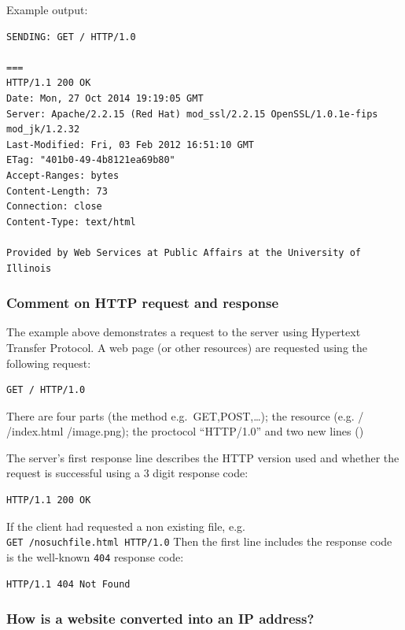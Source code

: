 \documentclass[]{article}
\begin{document}
Example output:

\begin{verbatim}
SENDING: GET / HTTP/1.0

===
HTTP/1.1 200 OK
Date: Mon, 27 Oct 2014 19:19:05 GMT
Server: Apache/2.2.15 (Red Hat) mod_ssl/2.2.15 OpenSSL/1.0.1e-fips mod_jk/1.2.32
Last-Modified: Fri, 03 Feb 2012 16:51:10 GMT
ETag: "401b0-49-4b8121ea69b80"
Accept-Ranges: bytes
Content-Length: 73
Connection: close
Content-Type: text/html

Provided by Web Services at Public Affairs at the University of Illinois
\end{verbatim}

\subsubsection{Comment on HTTP request and
response}\label{comment-on-http-request-and-response}

The example above demonstrates a request to the server using Hypertext
Transfer Protocol. A web page (or other resources) are requested using
the following request:

\begin{verbatim}
GET / HTTP/1.0
\end{verbatim}

There are four parts (the method e.g.~GET,POST,\ldots{}); the resource
(e.g. / /index.html /image.png); the proctocol ``HTTP/1.0'' and two new
lines ()

The server's first response line describes the HTTP version used and
whether the request is successful using a 3 digit response code:

\begin{verbatim}
HTTP/1.1 200 OK
\end{verbatim}

If the client had requested a non existing file, e.g.
\texttt{GET\ /nosuchfile.html\ HTTP/1.0} Then the first line includes
the response code is the well-known \texttt{404} response code:

\begin{verbatim}
HTTP/1.1 404 Not Found
\end{verbatim}

\subsubsection{How is a website converted into an IP
address?}\label{how-is-a-website-converted-into-an-ip-address}
\end{document}
